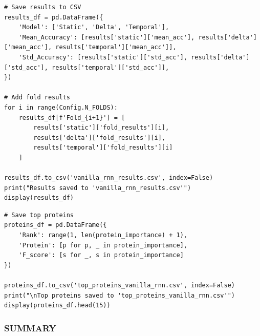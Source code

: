 \begin{lstlisting}
# Save results to CSV
results_df = pd.DataFrame({
    'Model': ['Static', 'Delta', 'Temporal'],
    'Mean_Accuracy': [results['static']['mean_acc'], results['delta']['mean_acc'], results['temporal']['mean_acc']],
    'Std_Accuracy': [results['static']['std_acc'], results['delta']['std_acc'], results['temporal']['std_acc']],
})
 
# Add fold results
for i in range(Config.N_FOLDS):
    results_df[f'Fold_{i+1}'] = [
        results['static']['fold_results'][i],
        results['delta']['fold_results'][i],
        results['temporal']['fold_results'][i]
    ]
 
results_df.to_csv('vanilla_rnn_results.csv', index=False)
print("Results saved to 'vanilla_rnn_results.csv'")
display(results_df)
\end{lstlisting}
 
\begin{lstlisting}
# Save top proteins
proteins_df = pd.DataFrame({
    'Rank': range(1, len(protein_importance) + 1),
    'Protein': [p for p, _ in protein_importance],
    'F_score': [s for _, s in protein_importance]
})
 
proteins_df.to_csv('top_proteins_vanilla_rnn.csv', index=False)
print("\nTop proteins saved to 'top_proteins_vanilla_rnn.csv'")
display(proteins_df.head(15))
\end{lstlisting}
 
\subsubsection*{SUMMARY}
 
